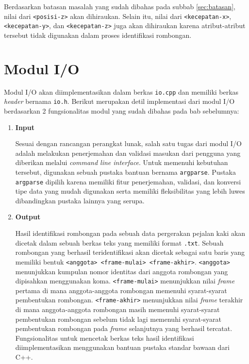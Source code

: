 Berdasarkan batasan masalah yang sudah dibahas pada subbab \ref{sec:batasan}, nilai dari \texttt{<posisi-z>} akan dihiraukan. Selain itu, nilai dari \texttt{<kecepatan-x>}, \texttt{<kecepatan-y>}, dan \texttt{<kecepatan-z>} juga akan dihiraukan karena atribut-atribut tersebut tidak digunakan dalam proses identifikasi rombongan.

\section{Modul I/O}
\label{sec:impl-io}

Modul I/O akan diimplementasikan dalam berkas \texttt{io.cpp} dan memiliki berkas \textit{header} bernama \texttt{io.h}. Berikut merupakan detil implementasi dari modul I/O berdasarkan 2 fungsionalitas modul yang sudah dibahas pada bab sebelumnya:

\begin{enumerate}
    \item \textbf{Input}
    
    Sesuai dengan rancangan perangkat lunak, salah satu tugas dari modul I/O adalah melakukan penerjemahan dan validasi masukan dari pengguna yang diberikan melalui \textit{command line interface}. Untuk memenuhi kebutuhan tersebut, digunakan sebuah pustaka bantuan bernama \texttt{argparse}. Pustaka \texttt{argparse} dipilih karena memiliki fitur penerjemahan, validasi, dan konversi tipe data yang mudah digunakan serta memiliki fleksibilitas yang lebih luwes dibandingkan pustaka lainnya yang serupa.
    
    \item \textbf{Output}
    
    Hasil identifikasi rombongan pada sebuah data pergerakan pejalan kaki akan dicetak dalam sebuah berkas teks yang memiliki format \texttt{.txt}. Sebuah rombongan yang berhasil teridentifikasi akan dicetak sebagai satu baris yang memiliki bentuk \texttt{<anggota> <frame-mulai> <frame-akhir>}. \texttt{<anggota>} menunjukkan kumpulan nomor identitas dari anggota rombongan yang dipisahkan menggunakan koma. \texttt{<frame-mulai>} menunjukkan nilai \textit{frame} pertama di mana anggota-anggota rombongan memenuhi syarat-syarat pembentukan rombongan. \texttt{<frame-akhir>} menunjukkan nilai \textit{frame} terakhir di mana anggota-anggota rombongan masih memenuhi syarat-syarat pembentukan rombongan sebelum tidak lagi memenuhi syarat-syarat pembentukan rombongan pada \textit{frame} selanjutnya yang berhasil tercatat. Fungsionalitas untuk mencetak berkas teks hasil identifikasi diimplementasikan menggunakan bantuan pustaka standar bawaan dari C++.
\end{enumerate}

